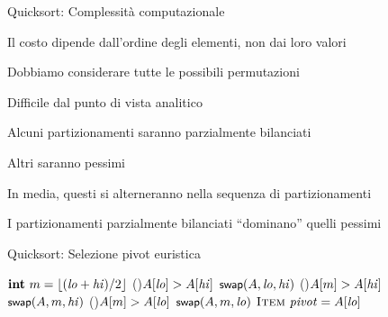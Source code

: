 \begin{frame}{Quicksort: Complessità computazionale}

\vspace{-9pt}
\BIL
\item Il costo dipende dall'ordine degli elementi, non dai loro valori
\item Dobbiamo considerare tutte le possibili permutazioni
\item Difficile dal punto di vista analitico
\EIL

\BIL
\item Alcuni partizionamenti saranno parzialmente bilanciati
\item Altri saranno pessimi
\item In media, questi si alterneranno nella sequenza di partizionamenti
\item I partizionamenti parzialmente bilanciati “dominano” quelli pessimi
\EIL
\end{frame}

\begin{frame}{Quicksort: Selezione pivot euristica}


\begin{Procedure}
\caption[A]{\INTEGER \Perno($\Item[\,]\ A$, \INTEGER $\Primo$, \INTEGER $\Ultimo$)}
$\INTEGER\ m = \lfloor (\Primo+\Ultimo)/2 \rfloor$\;
\If(){$A[\mathit{lo}] > A[\mathit{hi}]$}{
  $\textsf{{\small swap}}(A,\mathit{lo},\mathit{hi})$\;
}
\If(){$A[m] > A[\mathit{hi}]$}{
  $\textsf{{\small swap}}(A,m,\mathit{hi})$\;
}
\If(){$A[m] > A[\mathit{lo}]$}{
  $\textsf{{\small swap}}(A,m,\mathit{lo})$\;
}
$\textsc{Item}\ \mathit{pivot} = A[\mathit{lo}]$\;
[...]\;
\end{Procedure}

\end{frame}

